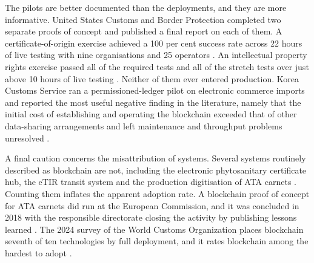 \documentclass[information,article,submit,moreauthors]{Definitions/mdpi}
\begin{document}
The pilots are better documented than the deployments, and they are more informative. United States Customs and Border Protection completed two separate proofs of concept and published a final report on each of them. A certificate-of-origin exercise achieved a 100 per cent success rate across 22 hours of live testing with nine organisations and 25 operators \cite{cbp2019nafta}. An intellectual property rights exercise passed all of the required tests and all of the stretch tests over just above 10 hours of live testing \cite{cbp2020ipr}. Neither of them ever entered production. Korea Customs Service ran a permissioned-ledger pilot on electronic commerce imports and reported the most useful negative finding in the literature, namely that the initial cost of establishing and operating the blockchain exceeded that of other data-sharing arrangements and left maintenance and throughput problems unresolved \cite{wconews2020korea}.

A final caution concerns the misattribution of systems. Several systems routinely described as blockchain are not, including the electronic phytosanitary certificate hub, the eTIR transit system and the production digitisation of ATA carnets \cite{unescap2024digitalizetrade,wco2022casestudies}. Counting them inflates the apparent adoption rate. A blockchain proof of concept for ATA carnets did run at the European Commission, and it was concluded in 2018 with the responsible directorate closing the activity by publishing lessons learned \cite{wco2022casestudies}. The 2024 survey of the World Customs Organization places blockchain seventh of ten technologies by full deployment, and it rates blockchain among the hardest to adopt \cite{wconews2024survey}.
\end{document}
